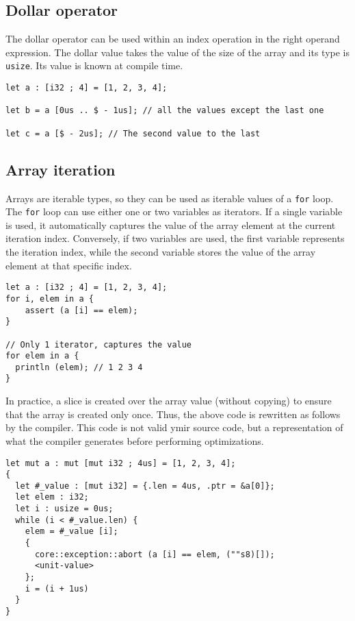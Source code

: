 \subsection {Dollar operator}

The dollar operator can be used within an index operation in the right operand
expression. The dollar value takes the value of the size of the array and its
type is \texttt{usize}. Its value is known at compile time.

\begin{lstlisting}[style=coloredverbatim]
let a : [i32 ; 4] = [1, 2, 3, 4];

let b = a [0us .. $ - 1us]; // all the values except the last one

let c = a [$ - 2us]; // The second value to the last
\end{lstlisting}

\subsection {Array iteration}

Arrays are iterable types, so they can be used as iterable values of a
\texttt{for} loop. The \texttt{for} loop can use either one or two variables as
iterators. If a single variable is used, it automatically captures the value of
the array element at the current iteration index. Conversely, if two variables
are used, the first variable represents the iteration index, while the second
variable stores the value of the array element at that specific index.

\begin{lstlisting}[style=coloredverbatim]
let a : [i32 ; 4] = [1, 2, 3, 4];
for i, elem in a {
    assert (a [i] == elem);
}

// Only 1 iterator, captures the value
for elem in a {
  println (elem); // 1 2 3 4
}
\end{lstlisting}

In practice, a slice is created over the array value (without copying) to ensure
that the array is created only once. Thus, the above code is rewritten as
follows by the compiler. This code is not valid ymir source code, but a
representation of what the compiler generates before performing optimizations.

\begin{lstlisting}[style=intermediateVerb]
let mut a : mut [mut i32 ; 4us] = [1, 2, 3, 4];
{
  let #_value : [mut i32] = {.len = 4us, .ptr = &a[0]};
  let elem : i32;
  let i : usize = 0us;
  while (i < #_value.len) {
    elem = #_value [i];
    {
      core::exception::abort (a [i] == elem, (""s8)[]);
      <unit-value>
    };
    i = (i + 1us)
  }
}
\end{lstlisting}


